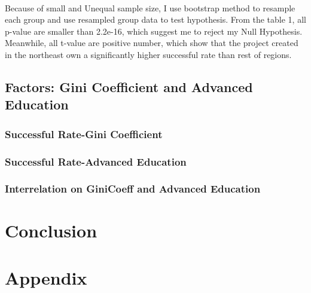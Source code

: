 \documentclass[a4paper,10pt]{article}
\begin{document}
\paragraph{}Because of small and Unequal sample size, I use bootstrap method to resample each group and use resampled group data to test hypothesis. From the table 1, all p-value are smaller than 2.2e-16, which suggest me to reject my Null Hypothesis. Meanwhile, all t-value are positive number, which show that  the project created in the northeast own a significantly higher successful rate than rest of regions.

\subsection{Factors: Gini Coefficient and Advanced Education}

\subsubsection{Successful Rate-Gini Coefficient}
\subsubsection{Successful Rate-Advanced Education}

\subsubsection{Interrelation on GiniCoeff and Advanced Education
}
\medskip

\section{Conclusion}

\section{Appendix}
\end{document}
